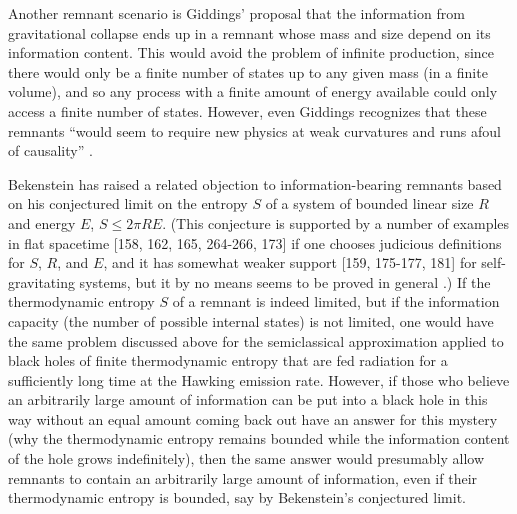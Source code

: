      Another remnant scenario is Giddings' proposal \cite{Gid92} that
the
information from gravitational collapse ends up in a remnant whose
mass and
size depend on its information content.  This would avoid the problem
of
infinite production, since there would only be a finite number of
states up to
any given mass (in a finite volume), and so any process with a finite
amount of
energy available could only access a finite number of states.
However, even
Giddings recognizes that these remnants ``would seem to require new
physics at
weak curvatures and runs afoul of causality'' \cite{Gid93}.

     Bekenstein \cite{Bek93b} has raised a related objection to
information-bearing remnants based on his conjectured limit
\cite{Bek81}
on the entropy $S$ of a system of bounded linear size $R$ and energy
$E$,
$S\le 2\pi RE$.  (This conjecture is supported by a number of
examples in flat spacetime
[158, 162, 165, 264-266, 173]
if one chooses judicious definitions for $S$, $R$, and $E$, and
it has somewhat weaker support
[159, 175-177, 181]
for self-gravitating systems, but it by no means seems to be proved
in general \cite{UW82,Unw82,Pag82b,UW83}.)
If the thermodynamic entropy $S$ of a remnant is indeed limited,
but if the information capacity (the number of possible internal
states)
is not limited,
one would have the same problem \cite{Pag80b} discussed above
for the semiclassical approximation applied to black holes of finite
thermodynamic entropy that are fed radiation
for a sufficiently long time at the Hawking emission rate.
However, if those who believe an arbitrarily large amount of
information can be put into a black hole in this way without an
equal amount coming back out have an answer for this
mystery (why the thermodynamic entropy remains bounded
while the information content of the hole grows indefinitely),
then the same answer would presumably allow remnants to
contain an arbitrarily large amount of information, even if their
thermodynamic entropy is bounded, say by Bekenstein's
conjectured limit.

